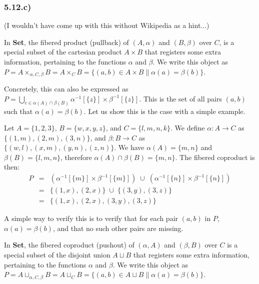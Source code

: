 \subsubsection*{5.12.c)}

(I wouldn't have come up with this without Wikipedia as a hint...)

In \textbf{Set}, the fibered product (pullback) of $(A, \alpha)$ and $(B, \beta)$ over $C$, is a special subset of the cartesian product $A \times B$ that registers some extra information, pertaining to the functions $\alpha$ and $\beta$. We write this object as $P = A \times_{\alpha, C, \beta} B = A \times_C B = \{ (a,b) \in A \times B \| \alpha(a) = \beta(b) \}$.

Concretely, this can also be expressed as $P = \bigcup_{c \in \alpha(A) \cap \beta(B)} \alpha^{-1}[\{z\}] \times \beta^{-1}[\{z\}]$. This is the set of all pairs $(a,b)$ such that $\alpha(a) = \beta(b)$. Let us show this is the case with a simple example.

Let $A = \{1,2,3\}$, $B = \{w, x, y, z\}$, and $C = \{l, m, n, k\}$. We define $\alpha : A \to C$ as $\{(1, m), (2, m), (3, n) \}$, and $\beta : B \to C$ as $\{ (w, l), (x, m), (y, n), (z, n) \}$. We have $\alpha(A) = \{m,n\}$ and $\beta(B) = \{l, m, n\}$, therefore $\alpha(A) \cap \beta(B) = \{m,n\}$. The fibered coproduct is then:
$$
\begin{array}{lll}
P &=& (\alpha^{-1}[\{m\}] \times \beta^{-1}[\{m\}]) \; \cup \; (\alpha^{-1}[\{n\}] \times \beta^{-1}[\{n\}]) \\
  &=& \{ (1,x), (2,x) \} \; \cup \; \{ (3,y), (3,z) \} \\
  &=& \{ (1,x), (2,x), (3,y), (3,z) \}
\end{array}
$$

A simple way to verify this is to verify that for each pair $(a,b)$ in $P$, $\alpha(a) = \beta(b)$, and that no such other pairs are missing.



In \textbf{Set}, the fibered coproduct (pushout) of $(\alpha, A)$ and $(\beta, B)$ over $C$ is a special subset of the disjoint union $A \sqcup B$ that registers some extra information, pertaining to the functions $\alpha$ and $\beta$. We write this object as $P = A \sqcup_{\alpha, C, \beta} B = A \sqcup_C B = \{ (a,b) \in A \sqcup B \| \alpha(a) = \beta(b) \}$.

